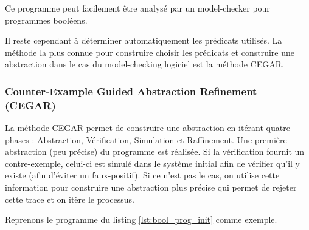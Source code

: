 Ce programme peut facilement être analysé par un model-checker pour programmes
booléens.

Il reste cependant à déterminer automatiquement les prédicats utilisés. La
méthode la plus connue pour construire choisir les prédicats et construire une
abstraction dans le cas du model-checking logiciel est la méthode
\ac{CEGAR}\cite{dsilva_survey_2008}.

\subsubsection{Counter-Example Guided Abstraction Refinement (CEGAR)}

La méthode \ac{CEGAR} permet de construire une abstraction en itérant quatre phases :
Abstraction, Vérification, Simulation et Raffinement. Une première abstraction
(peu précise) du programme est réalisée. Si la vérification fournit un
contre-exemple, celui-ci est simulé dans le système initial afin de vérifier
qu'il y existe (afin d'éviter un faux-positif). Si ce n'est pas le cas, on
utilise cette information pour
construire une abstraction plus précise qui permet de rejeter cette trace et on
itère le processus.

Reprenons le programme du listing \ref{lst:bool_prog_init} comme exemple.

